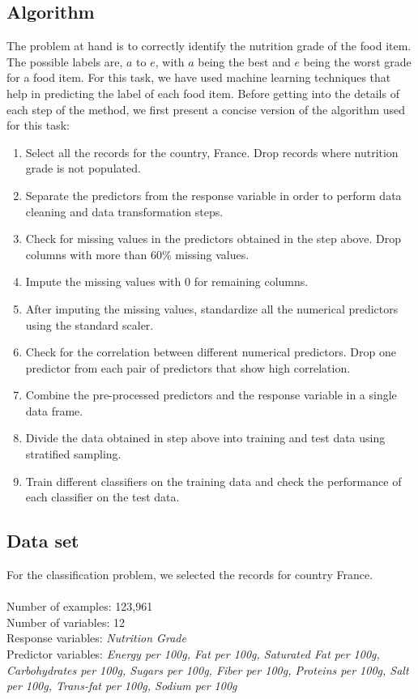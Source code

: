 \documentclass[sigconf]{acmart}
\begin{document}
\subsection{Algorithm}
The problem at hand is to correctly identify the nutrition grade of the food item. The possible labels are, $a$ to $e$, with $a$ being the best and $e$ being the worst grade for a food item. For this task, we have used machine learning techniques that help in predicting the label of each food item. Before getting into the details of each step of the method, we first present a concise version of the algorithm used for this task:

\begin{enumerate}
  \item Select all the records for the country, France. Drop records where nutrition grade is not populated.
  \item Separate the predictors from the response variable in order to perform data cleaning and data transformation steps.
  \item Check for missing values in the predictors obtained in the step above. Drop columns with more than 60\% missing values.
   \item Impute the missing values with 0 for remaining columns.
   \item After imputing the missing values, standardize all the numerical predictors using the standard scaler.
   \item Check for the correlation between different numerical predictors. Drop one predictor from each pair of predictors that show high correlation.
   \item Combine the pre-processed predictors and the response variable in a single data frame.
   \item Divide the data obtained in step above into training and test data using stratified sampling.
   \item Train different classifiers on the training data and check the performance of each classifier on the test data.
\end{enumerate}

\subsection{Data set}
For the classification problem, we selected the records for country France. \\ \\
Number of examples: 123,961 \\
Number of variables: 12 \\
Response variables: {\em Nutrition Grade} \\
Predictor variables: {\em Energy per 100g, Fat per 100g, Saturated Fat per 100g, Carbohydrates per 100g, Sugars per 100g, Fiber per 100g, Proteins per 100g, Salt per 100g, Trans-fat per 100g, Sodium per 100g}
\end{document}
